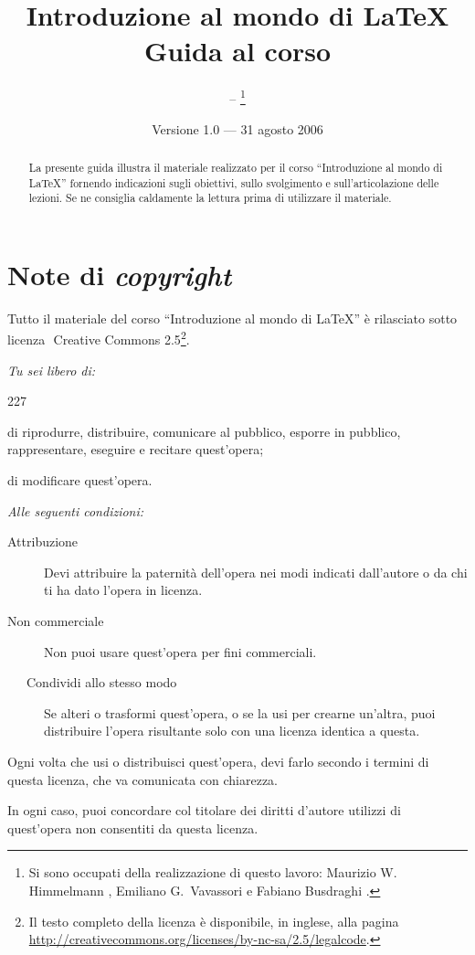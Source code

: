\documentclass[a4paper,12pt]{article}
\title{Introduzione al mondo di \LaTeX \\ Guida al corso}
\author{{\LARGE\GuIT} -- \GuITtext\thanks{Si sono occupati della
realizzazione di questo lavoro: Maurizio W. Himmelmann
\email{himmel@sssup.it}, Emiliano G.~Vavassori
\email{testina@sssup.it} e Fabiano Busdraghi
\email{fabusdr@yahoo.com}.}}
\date{Versione 1.0 --- 31 agosto 2006}
\begin{document}
\maketitle

\begin{abstract}
La presente guida illustra il materiale realizzato per il corso
``Introduzione al mondo di  \LaTeX'' fornendo indicazioni sugli
obiettivi, sullo svolgimento e sull'articolazione delle lezioni. Se ne
consiglia caldamente la lettura prima di utilizzare il materiale.
\end{abstract}

\tableofcontents
\newpage

\section{Note di \textit{copyright}}\label{copy}
Tutto il materiale del corso ``Introduzione al mondo di \LaTeX'' \`e
rilasciato sotto licenza $\!$\cc$\!\!\!$ Creative Commons
2.5\footnote{Il testo completo della licenza \`e disponibile, in
inglese, alla pagina
\url{http://creativecommons.org/licenses/by-nc-sa/2.5/legalcode}.}.

\noindent\emph{Tu sei libero di:}
\begin{dinglist}{227}
    \item di riprodurre, distribuire, comunicare al pubblico, esporre
	in pubblico, rappresentare, eseguire e recitare quest'opera;
    \item di modificare quest'opera.
\end{dinglist}

\noindent\emph{Alle seguenti condizioni:}
\begin{description}
    \item[\ccby Attribuzione] Devi attribuire la paternit\`a
	dell'opera nei modi indicati dall'autore o da chi ti ha dato
	l'opera in licenza.
    \item[\ccnc Non commerciale] Non puoi usare quest'opera per fini
	commerciali.
    \item[\ \ccsa\ \ $\!\!$Condividi allo stesso modo] Se alteri o
	trasformi quest'opera, o se la usi per crearne un'altra, puoi
	distribuire l'opera risultante solo con una licenza identica a
	questa.
\end{description}

\begin{dinglist}{52}
    \item Ogni volta che usi o distribuisci quest'opera, devi farlo
	secondo i termini di questa licenza, che va comunicata con
	chiarezza.
    \item In ogni caso, puoi concordare col titolare dei diritti
	d'autore utilizzi di quest'opera non consentiti da questa
	licenza.
\end{dinglist}
\end{document}
